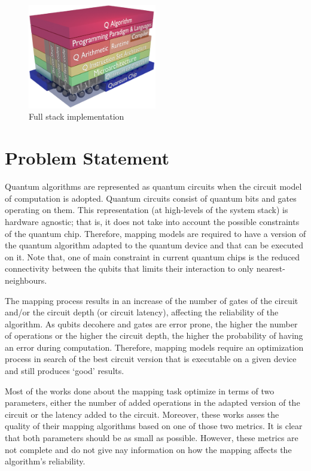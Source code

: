 \begin{figure}[htbp]
\centering
\includegraphics[width=0.5\textwidth]{figures/system_stack.png}
\caption{\label{fig:system_stack}
Full stack implementation \cite{Fu:2017:EMS:3123939.3123952}}
\end{figure}

\section{Problem Statement}
\label{sec:org81811d9}
Quantum algorithms are represented as quantum circuits when the circuit model of computation is adopted. Quantum circuits consist of quantum bits and gates operating on them.
This representation (at high-levels of the system stack) is hardware agnostic; that is, it does not take into account the possible constraints of the quantum chip. Therefore, mapping models are required to have a version of the quantum algorithm adapted to the quantum device and that can be executed on it. Note that, one of main constraint in current quantum chips is the reduced connectivity between the qubits that limits their interaction to only nearest- neighbours.


The mapping process results in an increase of the number of gates of the circuit and/or the circuit depth (or circuit latency), affecting the reliability of the algorithm. As qubits decohere and gates are error prone, the higher the number of operations or the higher the circuit depth, the higher the probability of having an error during computation.  Therefore, mapping models require an optimization process in search of the best circuit version that is executable on a given device and still produces `good' results.

Most of the works done about the mapping task optimize in terms of two parameters, either the number of added operations in the adapted version of the circuit or the latency added to the circuit. Moreover, these works asses the quality of their mapping algorithms based on one of those two metrics. It is clear that both parameters should be as small as possible. However, these metrics are not complete and do not give nay information on how the mapping affects the algorithm's reliability.

